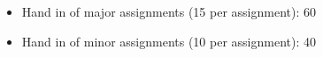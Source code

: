 \begin{itemize}
	\item Hand in of major assignments (15 per assignment): 60
	\item Hand in of minor assignments (10 per assignment): 40
\end{itemize}
